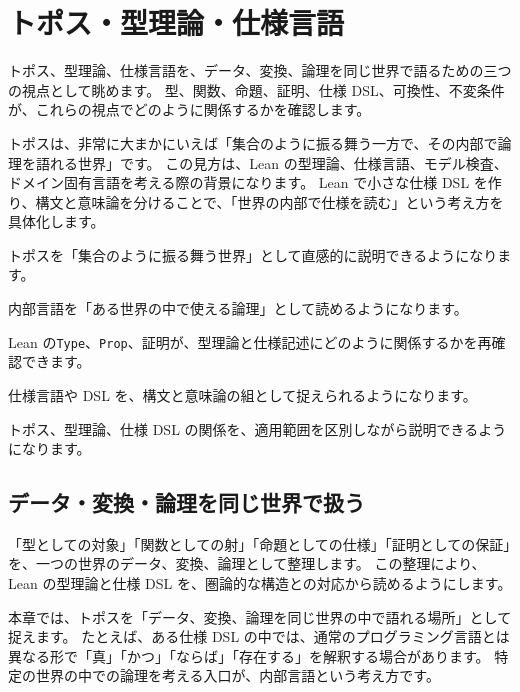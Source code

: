 \chapter{トポス・型理論・仕様言語}
\label{chap:ch39-topos-type-theory-spec-languages}

\begin{chapterabstract}
トポス、型理論、仕様言語を、データ、変換、論理を同じ世界で語るための三つの視点として眺めます。
型、関数、命題、証明、仕様 DSL、可換性、不変条件が、これらの視点でどのように関係するかを確認します。

トポスは、非常に大まかにいえば「集合のように振る舞う一方で、その内部で論理を語れる世界」です。
この見方は、Lean の型理論、仕様言語、モデル検査、ドメイン固有言語を考える際の背景になります。
Lean で小さな仕様 DSL を作り、構文と意味論を分けることで、「世界の内部で仕様を読む」という考え方を具体化します。
\end{chapterabstract}

\begin{learninggoals}
  \item トポスを「集合のように振る舞う世界」として直感的に説明できるようになります。
  \item 内部言語を「ある世界の中で使える論理」として読めるようになります。
  \item Lean の\texttt{Type}、\texttt{Prop}、証明が、型理論と仕様記述にどのように関係するかを再確認できます。
  \item 仕様言語や DSL を、構文と意味論の組として捉えられるようになります。
  \item トポス、型理論、仕様 DSL の関係を、適用範囲を区別しながら説明できるようになります。
\end{learninggoals}

\section{データ・変換・論理を同じ世界で扱う}

「型としての対象」「関数としての射」「命題としての仕様」「証明としての保証」を、一つの世界のデータ、変換、論理として整理します。
この整理により、Lean の型理論と仕様 DSL を、圏論的な構造との対応から読めるようにします。

本章では、トポスを「データ、変換、論理を同じ世界の中で語れる場所」として捉えます。
たとえば、ある仕様 DSL の中では、通常のプログラミング言語とは異なる形で「真」「かつ」「ならば」「存在する」を解釈する場合があります。
特定の世界の中での論理を考える入口が、内部言語という考え方です。

